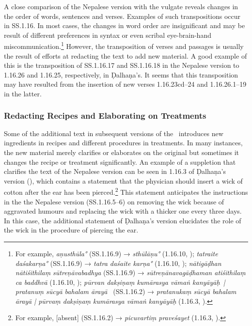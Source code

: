 A close comparison of the Nepalese version with the vulgate reveals changes in the 
order of words, sentences and verses. Examples of such transpositions occur in SS.1.16. In 
most cases, the changes in word order are insignificant and may be result of different 
preferences in syntax or even scribal eye-brain-hand miscommunication.\footnote{For 
example, \emph{aṇusthūla°} (SS.1.16.9) → \emph{sthūlāṇu°} (1.16.10, \cite[77]{vulgate}); 
\emph{tatraite daśakarṇa°} (SS.1.16.9) → \emph{tatra daśaite karṇa°} (1.16.10, 
\cite[77]{vulgate}); \emph{nātigāḍhan nātiśithilaṃ sūtreṇāvabadhya} (SS.1.16.9) → 
\emph{sūtreṇānavagāḍhaman atiśithilaṃ ca baddhvā} (1.16.10, \cite[77]{vulgate}); 
\emph{pūrvan dakṣiṇaṃ kumārasya vāmaṅ kanyāyāḥ | pratanuṃ sūcyā bahalam ārayā } 
(SS.1.16.2) → \emph{pratanukaṃ sūcyā bahalam ārayā | pūrvaṃ dakṣiṇaṃ kumārasya 
vāmaṅ kanyāyāḥ} (1.16.3, \cite[76]{vulgate}).} However, the transposition of verses and 
passages is usually the result of efforts at redacting the text to add new material. A good 
example of this is the transposition of SS.1.16.17 and SS.1.16.18 in the Nepalese version to 
1.16.26 and 1.16.25, respectively, in Ḍalhaṇa's. It seems that this transposition may have 
resulted from the insertion of new verses 1.16.23cd–24 and 1.16.26.1–19 in the latter.


%
\subsubsection{Redacting Recipes and Elaborating on Treatments}
Some of the additional text in subsequent versions of the \SS\ introduces new ingredients in recipes and different procedures in treatments. In many instances, the new material merely clarifies or elaborates on the original but sometimes it changes the recipe or treatment significantly. An example of a suppletion that clarifies the text of the Nepalese version can be seen in 1.16.3 of Ḍalhaṇa's version (\cite[76]{vulgate}), which contains a statement that the physician should insert a wick of cotton after the ear has been pierced.\footnote{For example, [absent] (SS.1.16.2) → \emph{picuvartiṃ praveśayet} (1.16.3, \cite[76]{vulgate}).} This statement anticipates the instructions in the the Nepalese version (SS.1.16.5–6) on removing the wick because of aggravated humours and replacing the wick with a thicker one every three days. In this case, the additional statement of Ḍalhaṇa's version elucidates the role of the wick in the procedure of piercing the ear. 

